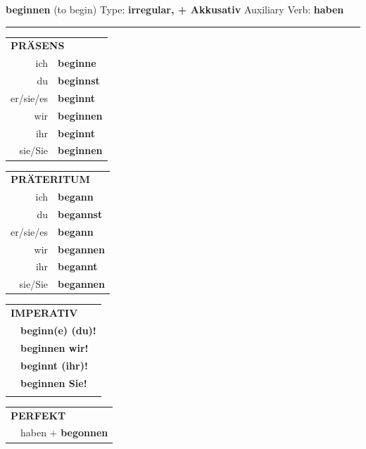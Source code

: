 \documentclass[10pt,a4paper]{revtex4-2}
\begin{document}
\begin{verbbox-acc}
    {\Large \bf beginnen} (to begin) \hfill Type: \textbf{irregular, + Akkusativ} \hfill Auxiliary Verb: \textbf{haben} 
    
     \vspace{5pt}

    \hrule
    
    \vspace{5pt}

  \begin{tabular}{rl}
     \multicolumn{2}{l}{\textbf{PRÄSENS} }\\
    ich & \textbf{beginne}\\
    du & \textbf{beginnst}\\
    er/sie/es & \textbf{beginnt}\\
    wir & \textbf{beginnen}\\
    ihr & \textbf{beginnt}\\
    sie/Sie & \textbf{beginnen}\\
  \end{tabular}
  \hfill
     \begin{tabular}{rl}
    \multicolumn{2}{l}{\textbf{PRÄTERITUM} }\\
    ich & \textbf{begann}\\
    du & \textbf{begannst}\\
    er/sie/es & \textbf{begann}\\
    wir & \textbf{begannen}\\
    ihr & \textbf{begannt}\\
    sie/Sie & \textbf{begannen}\\
  \end{tabular}
  \hfill
  \begin{tabular}{rl}
     \multicolumn{2}{l}{\textbf{IMPERATIV} }\\
   & \textbf{beginn(e) (du)!}\\
   & \textbf{beginnen wir!}\\
   & \textbf{beginnt (ihr)!}\\
   & \textbf{beginnen Sie!}\\
   & \vspace{10pt}
  \end{tabular}

    \vspace{10pt}

 \begin{tabular}{rl}
     \multicolumn{2}{l}{\textbf{PERFEKT}}\\
  &  haben + \textbf{begonnen}\\
  \end{tabular}
\hfill
   \begin{tabular}{rl}
   

\end{tabular}
\end{verbbox-acc}
\end{document}
